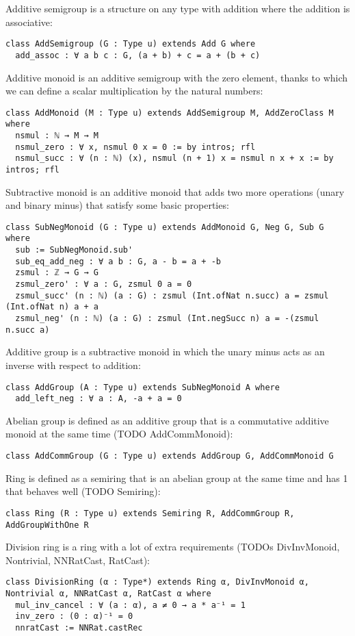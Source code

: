 \documentclass[]{article}
\renewcommand{\.}{\hskip .75pt}
\begin{document}
Additive semigroup is a structure on any type with addition where the addition is associative:
\begin{lstlisting}
class AddSemigroup (G : Type u) extends Add G where
  add_assoc : ∀ a b c : G, (a + b) + c = a + (b + c)
\end{lstlisting}
Additive monoid is an additive semigroup with the zero element, thanks to which we can
define a scalar multiplication by the natural numbers:
\begin{lstlisting}
class AddMonoid (M : Type u) extends AddSemigroup M, AddZeroClass M where
  nsmul : ℕ → M → M
  nsmul_zero : ∀ x, nsmul 0 x = 0 := by intros; rfl
  nsmul_succ : ∀ (n : ℕ) (x), nsmul (n + 1) x = nsmul n x + x := by intros; rfl
\end{lstlisting}
Subtractive monoid is an additive monoid that adds two more operations (unary and binary minus)
that satisfy some basic properties:
\begin{lstlisting}
class SubNegMonoid (G : Type u) extends AddMonoid G, Neg G, Sub G where
  sub := SubNegMonoid.sub'
  sub_eq_add_neg : ∀ a b : G, a - b = a + -b 
  zsmul : ℤ → G → G
  zsmul_zero' : ∀ a : G, zsmul 0 a = 0 
  zsmul_succ' (n : ℕ) (a : G) : zsmul (Int.ofNat n.succ) a = zsmul (Int.ofNat n) a + a
  zsmul_neg' (n : ℕ) (a : G) : zsmul (Int.negSucc n) a = -(zsmul n.succ a)
\end{lstlisting}
Additive group is a subtractive monoid in which the unary minus acts as an inverse with respect to addition:
\begin{lstlisting}
class AddGroup (A : Type u) extends SubNegMonoid A where
  add_left_neg : ∀ a : A, -a + a = 0
\end{lstlisting}
Abelian group is defined as an additive group that is a commutative additive monoid at the same time (TODO AddCommMonoid):
\begin{lstlisting}
class AddCommGroup (G : Type u) extends AddGroup G, AddCommMonoid G
\end{lstlisting}
Ring is defined as a semiring that is an abelian group at the same time and has 1 that behaves well (TODO Semiring):
\begin{lstlisting}
class Ring (R : Type u) extends Semiring R, AddCommGroup R, AddGroupWithOne R
\end{lstlisting}
Division ring is a ring with a lot of extra requirements (TODOs DivInvMonoid, Nontrivial, NNRatCast, RatCast):
\begin{lstlisting}
class DivisionRing (α : Type*) extends Ring α, DivInvMonoid α, Nontrivial α, NNRatCast α, RatCast α where
  mul_inv_cancel : ∀ (a : α), a ≠ 0 → a * a⁻¹ = 1
  inv_zero : (0 : α)⁻¹ = 0
  nnratCast := NNRat.castRec
\end{lstlisting}
\end{document}
